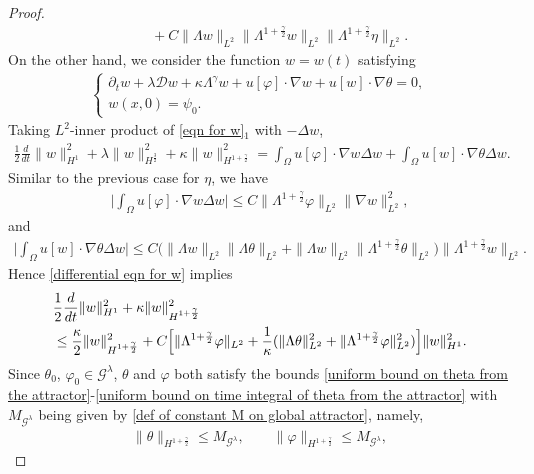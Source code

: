 \documentclass[reqno]{amsart}%
\theoremstyle{definition}
\theoremstyle{remark}
\numberwithin{equation}{section}
\newcommand{\dt}{\partial_t}
\newcommand{\1}{\mathbf{1}}
\newcommand{\Gg}{\mathcal{G}^{\lambda}}
\newcommand{\intox}{\int_{\Omega}}
\numberwithin{equation}{section}
\numberwithin{theorem}{section}
\numberwithin{figure}{section}
\begin{document}
\begin{proof}
\begin{align}
&\qquad+C\|\Lambda w\|_{L^2}\|\Lambda^{1+\frac{\gamma}{2}}w\|_{L^2}\|\Lambda^{1+\frac{\gamma}{2}}\eta\|_{L^2}.
\end{align}
On the other hand, we consider the function $w=w(t)$ satisfying
\begin{align}\label{eqn for w}
\left\{ \begin{array}{l}
\dt w+\lambda\mathcal{D}w+\kappa\Lambda^\gamma w+u[\varphi]\cdot\nabla w+u[w]\cdot\nabla\theta=0, \\
w(x,0)=\psi_0.
\end{array}\right.
\end{align}
Taking $L^2$-inner product of \eqref{eqn for w}$_1$ with $-\Delta w$,
\begin{align}\label{differential eqn for w}
\frac{1}{2}\frac{d}{dt}\|w\|^2_{H^1}+\lambda\|w\|^2_{H^{\frac{3}{2}}}+\kappa\|w\|^2_{H^{1+\frac{\gamma}{2}}}=\intox u[\varphi]\cdot\nabla w\Delta w+\intox u[w]\cdot\nabla\theta\Delta w.
\end{align}
Similar to the previous case for $\eta$, we have
\begin{align*}
\Big|\intox u[\varphi]\cdot\nabla w\Delta w\Big|\le C\|\Lambda^{1+\frac{\gamma}{2}}\varphi\|_{L^2}\|\nabla w\|^2_{L^2},
\end{align*}
and 
\begin{align*}
\Big|\intox u[w]\cdot\nabla\theta\Delta w\Big|\le C\Big(\|\Lambda w\|_{L^2}\|\Lambda\theta\|_{L^2}+\|\Lambda w\|_{L^2}\|\Lambda^{1+\frac{\gamma}{2}}\theta\|_{L^2}\Big)\|\Lambda^{1+\frac{\gamma}{2}}w\|_{L^2}.
\end{align*} 
Hence \eqref{differential eqn for w} implies
\begin{align}\label{differential eqn for w step 2}
&\frac{1}{2}\frac{d}{dt}\|w\|^2_{H^1}+\kappa\|w\|^2_{H^{1+\frac{\gamma}{2}}}\notag\\
&\le\frac{\kappa}{2}\|w\|^2_{H^{1+\frac{\gamma}{2}}}+C\Big[\|\Lambda^{1+\frac{\gamma}{2}}\varphi\|_{L^2}+\frac{1}{\kappa}(\|\Lambda\theta\|^2_{L^2}+\|\Lambda^{1+\frac{\gamma}{2}}\varphi\|^2_{L^2})\Big]\|w\|^2_{H^1}.
\end{align}
Since $\theta_0$, $\varphi_0\in\Gg$, $\theta$ and $\varphi$ both satisfy the bounds \eqref{uniform bound on theta from the attractor}-\eqref{uniform bound on time integral of theta from the attractor} with $M_{\Gg}$ being given by \eqref{def of constant M on global attractor}, namely,
\begin{align}\label{uniform bound on theta and varphi}
\|\theta\|_{H^{1+\frac{\gamma}{2}}}\le M_{\Gg},\qquad \|\varphi\|_{H^{1+\frac{\gamma}{2}}}\le M_{\Gg},

\end{align}
\end{proof}
\end{document}
